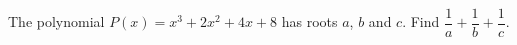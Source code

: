 The polynomial $P(x)=x^3+2x^2+4x+8$ has roots $a$, $b$ and $c$. Find $\dfrac{1}{a}+\dfrac{1}{b}+\dfrac{1}{c}$.
